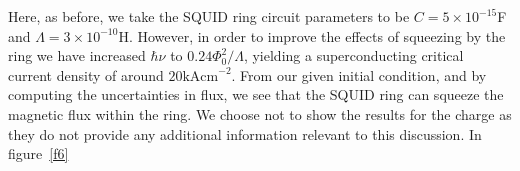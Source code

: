 \documentclass[twocolumn,a4paper,superscriptaddress,showpacs,floatfix,pra]{revtex4}
\begin{document}
Here,  as before,  we take  the SQUID  ring circuit  parameters  to be
$C=5\times      10^{-15}$\textrm{F}     and      $\Lambda     =3\times
10^{-10}$\textrm{H}.  However,  in order  to  improve  the effects  of
squeezing  by the ring  we have  increased $\hbar  \nu $  to $0.24\Phi
_{0}^{2}/\Lambda  $,  yielding   a  superconducting  critical  current
density  of  around  $20\mathrm{kAcm}^{-2}$.  From our  given  initial
condition, and by computing the uncertainties in flux, we see that the
SQUID ring  can squeeze the magnetic  flux within the  ring. We choose
not to  show the  results for the  charge as  they do not  provide any
additional   information    {relevant   to   this    discussion}.   In
figure~\ref{f6}
\begin{figure}[!t]
\begin{center}

\end{center}
\end{figure}
\end{document}
